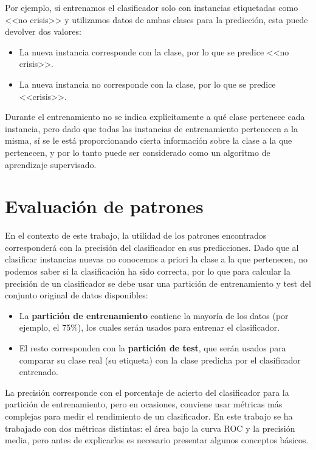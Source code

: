 Por ejemplo, si entrenamos el clasificador solo con instancias etiquetadas como <<no crisis>> y utilizamos datos de ambas clases para la predicción, esta puede devolver dos valores: 

\begin{itemize}
	\item La nueva instancia corresponde con la clase, por lo que se predice <<no crisis>>. 
	\item La nueva instancia no corresponde con la clase, por lo que se predice <<crisis>>. 
\end{itemize}

Durante el entrenamiento no se indica explícitamente a qué clase pertenece cada instancia, pero dado que todas las instancias de entrenamiento pertenecen a la misma, sí se le está proporcionando cierta información sobre la clase a la que pertenecen, y por lo tanto puede ser considerado como un algoritmo de aprendizaje supervisado. 

\section{Evaluación de patrones}

En el contexto de este trabajo, la utilidad de los patrones encontrados corresponderá con la precisión del clasificador en sus predicciones. Dado que al clasificar instancias nuevas no conocemos a priori la clase a la que pertenecen, no podemos saber si la clasificación ha sido correcta, por lo que para calcular la precisión de un clasificador se debe usar una partición de entrenamiento y test del conjunto original de datos disponibles: 

\begin{minipage}{\linewidth}
\begin{itemize}
	\item La \textbf{partición de entrenamiento} contiene la mayoría de los datos (por ejemplo, el 75\%), los cuales serán usados para entrenar el clasificador. 
	\item El resto corresponden con la \textbf{partición de test}, que serán usados para comparar su clase real (su etiqueta) con la clase predicha por el clasificador entrenado.
\end{itemize} 
\end{minipage} 

La precisión corresponde con el porcentaje de acierto del clasificador para la partición de entrenamiento, pero en ocasiones, conviene usar métricas más complejas para medir el rendimiento de un clasificador. En este trabajo se ha trabajado con dos métricas distintas: el área bajo la curva ROC y la precisión media, pero antes de explicarlos es necesario presentar algunos conceptos básicos.  

